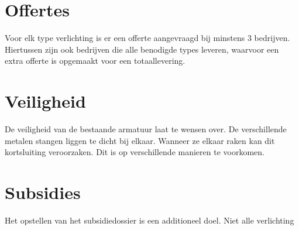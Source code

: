 \documentclass[a4paper,12pt]{article}
\begin{document}
	\section{Offertes}
	
	Voor elk type verlichting is er een offerte aangevraagd bij minstens 3 bedrijven. Hiertussen zijn ook bedrijven die alle benodigde types leveren, waarvoor een extra offerte is opgemaakt voor een totaallevering.
	\section{Veiligheid}
	De veiligheid van de bestaande armatuur laat te wensen over. De verschillende metalen stangen liggen te dicht bij elkaar. Wanneer ze elkaar raken kan dit kortsluiting veroorzaken. Dit is op verschillende manieren te voorkomen.
	
	
	\section{Subsidies}
	Het opstellen van het subsidiedossier is een additioneel doel. Niet alle verlichting
\end{document}

